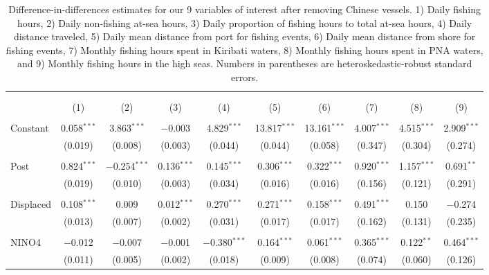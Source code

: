 \documentclass[12pt]{article}
\begin{document}
\begin{landscape}
\begin{table}[H] \centering 
  \caption{\label{tab:DID_without_CHN}Difference-in-differences estimates for our 9 variables of interest after removing Chinese vessels. 1) Daily fishing hours, 2) Daily non-fishing at-sea hours, 3) Daily proportion of fishing hours to total at-sea hours, 4) Daily distance traveled, 5) Daily mean distance from port for fishing events, 6) Daily mean distance from shore for fishing events, 7) Monthly fishing hours spent in Kiribati waters, 8) Monthly fishing hours spent in PNA waters, and 9) Monthly fishing hours in the high seas. Numbers in parentheses are heteroskedastic-robust standard errors.} 
  \label{} 
\footnotesize 
\begin{tabular}{@{\extracolsep{1pt}}lccccccccc} 
\\[-1.8ex]\hline 
\hline \\[-1.8ex] 
\\[-1.8ex] & (1) & (2) & (3) & (4) & (5) & (6) & (7) & (8) & (9)\\ 
\hline \\[-1.8ex] 
 Constant & 0.058$^{***}$ & 3.863$^{***}$ & $-$0.003 & 4.829$^{***}$ & 13.817$^{***}$ & 13.161$^{***}$ & 4.007$^{***}$ & 4.515$^{***}$ & 2.909$^{***}$ \\ 
  & (0.019) & (0.008) & (0.003) & (0.044) & (0.044) & (0.058) & (0.347) & (0.304) & (0.274) \\ 
  & & & & & & & & & \\ 
 Post & 0.824$^{***}$ & $-$0.254$^{***}$ & 0.136$^{***}$ & 0.145$^{***}$ & 0.306$^{***}$ & 0.322$^{***}$ & 0.920$^{***}$ & 1.157$^{***}$ & 0.691$^{**}$ \\ 
  & (0.019) & (0.010) & (0.003) & (0.034) & (0.016) & (0.016) & (0.156) & (0.121) & (0.291) \\ 
  & & & & & & & & & \\ 
 Displaced & 0.108$^{***}$ & 0.009 & 0.012$^{***}$ & 0.270$^{***}$ & 0.271$^{***}$ & 0.158$^{***}$ & 0.491$^{***}$ & 0.150 & $-$0.274 \\ 
  & (0.013) & (0.007) & (0.002) & (0.031) & (0.017) & (0.017) & (0.162) & (0.131) & (0.235) \\ 
  & & & & & & & & & \\ 
 NINO4 & $-$0.012 & $-$0.007 & $-$0.001 & $-$0.380$^{***}$ & 0.164$^{***}$ & 0.061$^{***}$ & 0.365$^{***}$ & 0.122$^{**}$ & 0.464$^{***}$ \\ 
  & (0.011) & (0.005) & (0.002) & (0.018) & (0.009) & (0.008) & (0.074) & (0.060) & (0.126) \\ 

\end{tabular}
\end{table}
\end{landscape}
\end{document}
